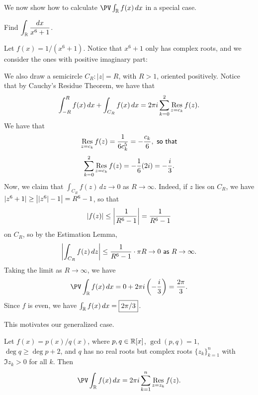 \documentclass{article}
\begin{document}
We now show how to calculate $\PV\int_\R f(x)\, dx$ in a special case.
\begin{example}
Find $\displaystyle\int_\mathbb R \frac{dx}{x^6+1}$.
\end{example}
\begin{solution}
Let $f(x) = 1/(x^6+1)$. Notice that $x^6+1$ only has complex roots, and we consider the ones with positive imaginary part: \newpage
\begin{center}
\end{center}
We also draw a semicircle $C_R: |z| = R$, with $R > 1$, oriented positively. Notice that by Cauchy's Residue Theorem, we have that
$$\int_{-R}^R f(x)\, dx + \int_{C_R} f(x)\, dx = 2\pi i\sum_{k=0}^2 \operatorname*{Res}_{z=c_k} f(z).$$
We have that
$$\operatorname*{Res}_{z=c_k} f(z) = \frac{1}{6c_k^5} = -\frac{c_k}6, \textsf{ so that}$$
$$\sum_{k=0}^2 \operatorname*{Res}_{z=c_k} f(z) = -\frac 16(2i) = -\frac i3.$$
Now, we claim that $\int_{C_R} f(z)\, dz \to 0$ as $R\to\infty$. Indeed, if $z$ lies on $C_R$, we have $|z^6+1| \geq \left||z^6| - 1\right| = R^6-1$, so that
$$|f(z)| \leq \left|\frac 1{R^6-1}\right| = \frac 1{R^6-1}$$
on $C_R$, so by the Estimation Lemma,
$$\left|\int_{C_R} f(z)\, dz\right| \leq \frac 1{R^6-1}\cdot \pi R \to 0 \textsf{ as } R\to\infty.$$
Taking the limit as $R\to\infty$, we have
$$\PV\int_\R f(x)\, dx = 0 + 2\pi i\paren{-\frac i3} = \frac {2\pi}3.$$
Since $f$ is even, we have $\int_\mathbb R f(x)\, dx = \boxed{2\pi/3}$.
\end{solution}
This motivates our generalized case.
\begin{theorem}
Let $f(x) = p(x)/q(x)$, where $p,q\in\mathbb R[x]$, $\gcd(p, q) = 1$, $\deg q \geq \deg p +2$, and $q$ has no real roots but complex roots $\{z_k\}_{k=1}^n$ with $\Im z_k>0$ for all $k$. Then
$$\PV\int_\R f(x)\, dx = 2\pi i\sum_{k=1}^n \Res_{z = z_k} f(z).$$
\end{theorem}
\setcounter{section}{103}
\end{document}
